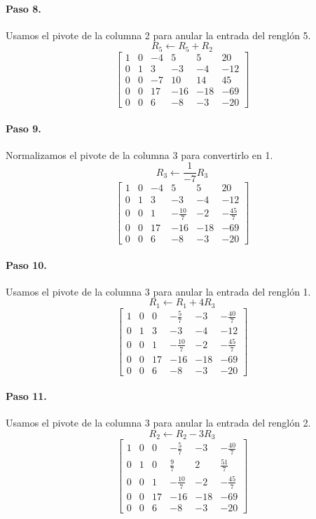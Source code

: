 \documentclass[12pt]{article}
\theoremstyle{remark}
\begin{document}
\paragraph{Paso 8.} Usamos el pivote de la columna 2 para anular la entrada del renglón 5.
\[
R_{5}\leftarrow R_{5}+R_{2}
\]
\[
\left[\begin{array}{ccccc|c}
1 & 0 & -4 & 5 & 5 & 20\\
0 & 1 & 3 & -3 & -4 & -12\\
0 & 0 & -7 & 10 & 14 & 45\\
0 & 0 & 17 & -16 & -18 & -69\\
0 & 0 & 6 & -8 & -3 & -20
\end{array}\right]
\]
\paragraph{Paso 9.} Normalizamos el pivote de la columna 3 para convertirlo en 1.
\[
R_{3}\leftarrow \frac{1}{-7}R_{3}
\]
\[
\left[\begin{array}{ccccc|c}
1 & 0 & -4 & 5 & 5 & 20\\
0 & 1 & 3 & -3 & -4 & -12\\
0 & 0 & 1 & - \frac{10}{7} & -2 & - \frac{45}{7}\\
0 & 0 & 17 & -16 & -18 & -69\\
0 & 0 & 6 & -8 & -3 & -20
\end{array}\right]
\]
\paragraph{Paso 10.} Usamos el pivote de la columna 3 para anular la entrada del renglón 1.
\[
R_{1}\leftarrow R_{1}+4R_{3}
\]
\[
\left[\begin{array}{ccccc|c}
1 & 0 & 0 & - \frac{5}{7} & -3 & - \frac{40}{7}\\
0 & 1 & 3 & -3 & -4 & -12\\
0 & 0 & 1 & - \frac{10}{7} & -2 & - \frac{45}{7}\\
0 & 0 & 17 & -16 & -18 & -69\\
0 & 0 & 6 & -8 & -3 & -20
\end{array}\right]
\]
\paragraph{Paso 11.} Usamos el pivote de la columna 3 para anular la entrada del renglón 2.
\[
R_{2}\leftarrow R_{2}-3R_{3}
\]
\[
\left[\begin{array}{ccccc|c}
1 & 0 & 0 & - \frac{5}{7} & -3 & - \frac{40}{7}\\
0 & 1 & 0 & \frac{9}{7} & 2 & \frac{51}{7}\\
0 & 0 & 1 & - \frac{10}{7} & -2 & - \frac{45}{7}\\
0 & 0 & 17 & -16 & -18 & -69\\
0 & 0 & 6 & -8 & -3 & -20
\end{array}\right]
\]
\end{document}
